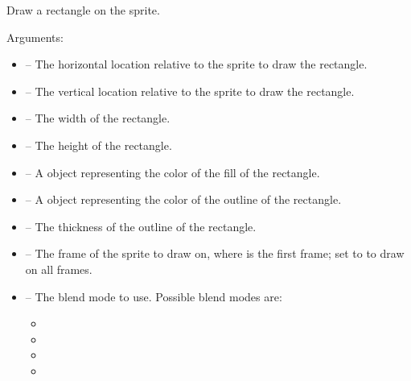 \documentclass[letterpaper,10pt,english]{sphinxmanual}
\begin{document}
\begin{fulllineitems}
\label{gfx:sge.gfx.Sprite.draw_rectangle}
Draw a rectangle on the sprite.

Arguments:
\begin{itemize}
\item {} 
 -- The horizontal location relative to the sprite to
draw the rectangle.

\item {} 
 -- The vertical location relative to the sprite to draw
the rectangle.

\item {} 
 -- The width of the rectangle.

\item {} 
 -- The height of the rectangle.

\item {} 
 -- A {\hyperref[gfx:sge.gfx.Color]{\emph{}}} object representing the
color of the fill of the rectangle.

\item {} 
 -- A {\hyperref[gfx:sge.gfx.Color]{\emph{}}} object representing
the color of the outline of the rectangle.

\item {} 
 -- The thickness of the outline of the
rectangle.

\item {} 
 -- The frame of the sprite to draw on, where 
is the first frame; set to  to draw on all
frames.

\item {} 
 -- The blend mode to use.  Possible blend modes
are:
\begin{itemize}
\item {} 

\item {} 

\item {} 

\item {} 


\end{itemize}
\end{itemize}
\end{fulllineitems}
\end{document}
